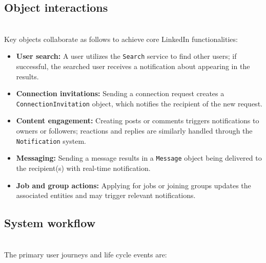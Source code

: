 \subsection{Object interactions}\label{obQj_gEnM0UmePZtBhVHD}
\\
Key objects collaborate as follows to achieve core LinkedIn functionalities:

\begin{itemize}
\item
\protect{}\label{4Vw9vimerojhjfp3ja83I}
\textbf{User search:} A user utilizes the \texttt{Search} service to find other users; if successful, the searched user receives a notification about appearing in the results.
\item
\protect{}\label{0FiWd6_n-selfZ9Elw9PH}
\textbf{Connection invitations:} Sending a connection request creates a \texttt{ConnectionInvitation} object, which notifies the recipient of the new request.
\item
\protect{}\label{wdxf9iyER-OBPi_NvSAjy}
\textbf{Content engagement:} Creating posts or comments triggers notifications to owners or followers; reactions and replies are similarly handled through the \texttt{Notification} system.
\item
\protect{}\label{0IR_fgGqfY23zwl4KcJTu}
\textbf{Messaging:} Sending a message results in a \texttt{Message} object being delivered to the recipient(s) with real-time notification.
\item
\protect{}\label{c9wFRopl9Abvbm_PD7jXT}
\textbf{Job and group actions:} Applying for jobs or joining groups updates the associated entities and may trigger relevant notifications.
\end{itemize}

\subsection{System workflow}\label{0dcQesllin5Y2EYoHqaD4}
\\
The primary user journeys and life cycle events are:

